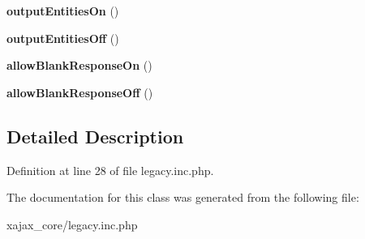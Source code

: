 \begin{DoxyCompactItemize}
\item 
\hypertarget{classlegacyXajax_a7e75c87cddf9beb2e1f0758ecd685c0b}{
{\bfseries outputEntitiesOn} ()}
\label{classlegacyXajax_a7e75c87cddf9beb2e1f0758ecd685c0b}

\item 
\hypertarget{classlegacyXajax_a4590e404e5d839f74788021cda83d78c}{
{\bfseries outputEntitiesOff} ()}
\label{classlegacyXajax_a4590e404e5d839f74788021cda83d78c}

\item 
\hypertarget{classlegacyXajax_a7c9c6a5cfddb987ea317a7a377cf72b6}{
{\bfseries allowBlankResponseOn} ()}
\label{classlegacyXajax_a7c9c6a5cfddb987ea317a7a377cf72b6}

\item 
\hypertarget{classlegacyXajax_a4269b33a5b91ec7039d3551e8e92ecb1}{
{\bfseries allowBlankResponseOff} ()}
\label{classlegacyXajax_a4269b33a5b91ec7039d3551e8e92ecb1}

\end{DoxyCompactItemize}


\subsection{Detailed Description}


Definition at line 28 of file legacy.inc.php.



The documentation for this class was generated from the following file:\begin{DoxyCompactItemize}
\item 
xajax\_\-core/legacy.inc.php\end{DoxyCompactItemize}
